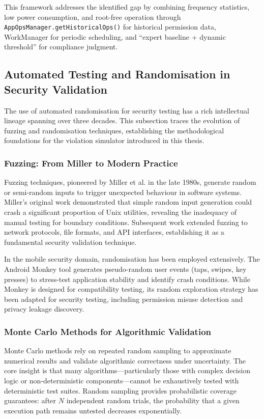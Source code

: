 This framework addresses the identified gap by combining frequency statistics, low power consumption, and root-free operation through \texttt{AppOpsManager.getHistoricalOps()} for historical permission data, WorkManager for periodic scheduling, and ``expert baseline + dynamic threshold'' for compliance judgment.

\subsection{Automated Testing and Randomisation in Security Validation}
The use of automated randomisation for security testing has a rich intellectual lineage spanning over three decades. This subsection traces the evolution of fuzzing and randomisation techniques, establishing the methodological foundations for the violation simulator introduced in this thesis.

\subsubsection{Fuzzing: From Miller to Modern Practice}
Fuzzing techniques, pioneered by Miller et al. in the late 1980s, generate random or semi-random inputs to trigger unexpected behaviour in software systems. Miller's original work demonstrated that simple random input generation could crash a significant proportion of Unix utilities, revealing the inadequacy of manual testing for boundary conditions. Subsequent work extended fuzzing to network protocols, file formats, and API interfaces, establishing it as a fundamental security validation technique.

In the mobile security domain, randomisation has been employed extensively. The Android Monkey tool generates pseudo-random user events (taps, swipes, key presses) to stress-test application stability and identify crash conditions. While Monkey is designed for compatibility testing, its random exploration strategy has been adapted for security testing, including permission misuse detection and privacy leakage discovery.

\subsubsection{Monte Carlo Methods for Algorithmic Validation}
Monte Carlo methods rely on repeated random sampling to approximate numerical results and validate algorithmic correctness under uncertainty. The core insight is that many algorithms—particularly those with complex decision logic or non-deterministic components—cannot be exhaustively tested with deterministic test suites. Random sampling provides probabilistic coverage guarantees: after \(N\) independent random trials, the probability that a given execution path remains untested decreases exponentially.

